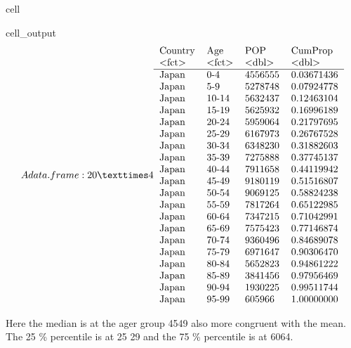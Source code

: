 \documentclass[letterpaper,10pt,english]{jupyterBook}
\begin{document}
\begin{sphinxuseclass}{cell}
\begin{sphinxVerbatimOutput}
\begin{sphinxuseclass}{cell_output}\begin{equation*}
\begin{split}A data.frame: 20 × 4
\begin{tabular}{llll}
 Country & Age & POP & CumProp\\
 <fct> & <fct> & <dbl> & <dbl>\\
\hline
	 Japan & 0-4   & 4556555 & 0.03671436\\
	 Japan & 5-9   & 5278748 & 0.07924778\\
	 Japan & 10-14 & 5632437 & 0.12463104\\
	 Japan & 15-19 & 5625932 & 0.16996189\\
	 Japan & 20-24 & 5959064 & 0.21797695\\
	 Japan & 25-29 & 6167973 & 0.26767528\\
	 Japan & 30-34 & 6348230 & 0.31882603\\
	 Japan & 35-39 & 7275888 & 0.37745137\\
	 Japan & 40-44 & 7911658 & 0.44119942\\
	 Japan & 45-49 & 9180119 & 0.51516807\\
	 Japan & 50-54 & 9069125 & 0.58824238\\
	 Japan & 55-59 & 7817264 & 0.65122985\\
	 Japan & 60-64 & 7347215 & 0.71042991\\
	 Japan & 65-69 & 7575423 & 0.77146874\\
	 Japan & 70-74 & 9360496 & 0.84689078\\
	 Japan & 75-79 & 6971647 & 0.90306470\\
	 Japan & 80-84 & 5652823 & 0.94861222\\
	 Japan & 85-89 & 3841456 & 0.97956469\\
	 Japan & 90-94 & 1930225 & 0.99511744\\
	 Japan & 95-99 &  605966 & 1.00000000\\
\end{tabular}\end{split}
\end{equation*}
\end{sphinxuseclass}\end{sphinxVerbatimOutput}

\end{sphinxuseclass}
\sphinxAtStartPar
Here the median is at the ager group 45\sphinxhyphen{}49 also more congruent with the mean. The 25 \% percentile is at 25 \sphinxhyphen{} 29 and the 75 \% percentile is at 60\sphinxhyphen{}64.
\end{document}
